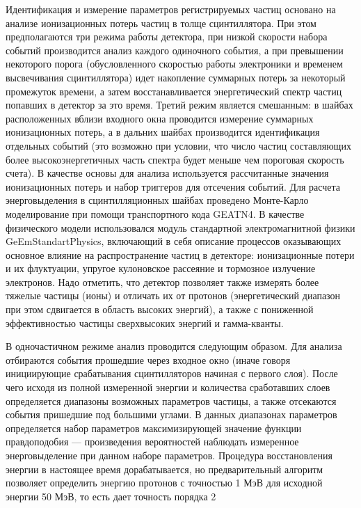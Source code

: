 Идентификация и измерение параметров регистрируемых частиц основано на анализе ионизационных потерь частиц в толще сцинтиллятора.  При этом предполагаются три режима работы детектора, при низкой скорости набора событий производится анализ каждого одиночного события, а при превышении некоторого порога (обусловленного скоростью работы электроники и временем высвечивания сцинтиллятора) идет накопление суммарных потерь за некоторый промежуток времени, а затем восстанавливается энергетический спектр частиц попавших в детектор за это время. Третий режим является смешанным: в шайбах расположенных вблизи входного окна проводится измерение суммарных ионизационных потерь, а в дальних шайбах производится идентификация отдельных событий (это возможно при условии, что число частиц составляющих более высокоэнергетичных часть спектра будет меньше чем пороговая скорость счета). В качестве основы для анализа используется рассчитанные значения ионизационных потерь и набор триггеров для отсечения событий. Для расчета энерговыделения в сцинтилляционных шайбах проведено Монте-Карло моделирование при помощи транспортного кода GEATN4.  В качестве физического модели использовался модуль стандартной электромагнитной физики GeEmStandartPhysics, включающий в себя описание процессов оказывающих основное влияние на распространение частиц в детекторе: ионизационные потери и их флуктуации, упругое кулоновское рассеяние и тормозное излучение электронов.
Надо отметить, что детектор позволяет также измерять более тяжелые частицы (ионы) и отличать их от протонов (энергетический диапазон при этом сдвигается в область высоких энергий), а также с пониженной эффективностью частицы сверхвысоких энергий и гамма-кванты.

В одночастичном режиме анализ проводится следующим образом. Для анализа отбираются события прошедшие через входное окно (иначе говоря инициирующие срабатывания сцинтилляторов начиная с первого слоя). После чего исходя из полной измеренной энергии и количества сработавших слоев определяется диапазоны возможных параметров частицы, а также отсекаются события пришедшие под большими углами. В данных диапазонах параметров определяется набор параметров максимизирующей значение функции правдоподобия --- произведения вероятностей наблюдать измеренное энерговыделение при данном наборе параметров. Процедура восстановления энергии в настоящее время дорабатывается, но предварительный алгоритм позволяет определить энергию протонов с точностью 1 МэВ для исходной энергии 50 МэВ, то есть дает точность порядка 2%

